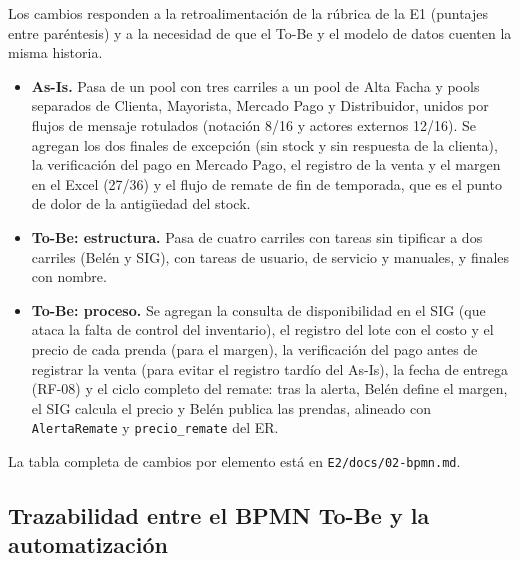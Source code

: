 \documentclass[11pt,letterpaper]{article}
\begin{document}
Los cambios responden a la retroalimentación de la rúbrica de la E1 (puntajes entre paréntesis) y a la necesidad de que el To-Be y el modelo de datos cuenten la misma historia.
\begin{itemize}
\item \textbf{As-Is.} Pasa de un pool con tres carriles a un pool de Alta Facha y pools separados de Clienta, Mayorista, Mercado Pago y Distribuidor, unidos por flujos de mensaje rotulados (notación 8/16 y actores externos 12/16). Se agregan los dos finales de excepción (sin stock y sin respuesta de la clienta), la verificación del pago en Mercado Pago, el registro de la venta y el margen en el Excel (27/36) y el flujo de remate de fin de temporada, que es el punto de dolor de la antigüedad del stock.
\item \textbf{To-Be: estructura.} Pasa de cuatro carriles con tareas sin tipificar a dos carriles (Belén y SIG), con tareas de usuario, de servicio y manuales, y finales con nombre.
\item \textbf{To-Be: proceso.} Se agregan la consulta de disponibilidad en el SIG (que ataca la falta de control del inventario), el registro del lote con el costo y el precio de cada prenda (para el margen), la verificación del pago antes de registrar la venta (para evitar el registro tardío del As-Is), la fecha de entrega (RF-08) y el ciclo completo del remate: tras la alerta, Belén define el margen, el SIG calcula el precio y Belén publica las prendas, alineado con \texttt{AlertaRemate} y \texttt{precio\_\allowbreak{}remate} del ER.
\end{itemize}
La tabla completa de cambios por elemento está en \texttt{E2/\allowbreak{}docs/\allowbreak{}02-bpmn.md}.


\subsection{Trazabilidad entre el BPMN To-Be y la automatización}
\end{document}
